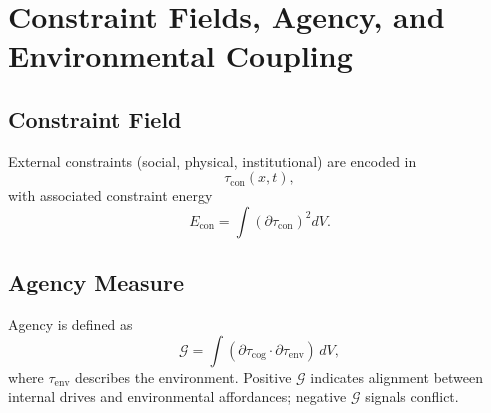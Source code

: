 \chapter{Constraint Fields, Agency, and Environmental Coupling}

\section{Constraint Field}
External constraints (social, physical, institutional) are encoded in
\[
\tau_{\mathrm{con}}(x,t),
\]
with associated constraint energy
\[
E_{\mathrm{con}} = \int (\partial\tau_{\mathrm{con}})^2 dV.
\]

\section{Agency Measure}
Agency is defined as
\[
\mathcal{G} = \int (\partial\tau_{\mathrm{cog}}\cdot \partial\tau_{\mathrm{env}})\, dV,
\]
where \(\tau_{\mathrm{env}}\) describes the environment.
Positive \(\mathcal{G}\) indicates alignment between internal drives and environmental affordances; negative \(\mathcal{G}\) signals conflict.


